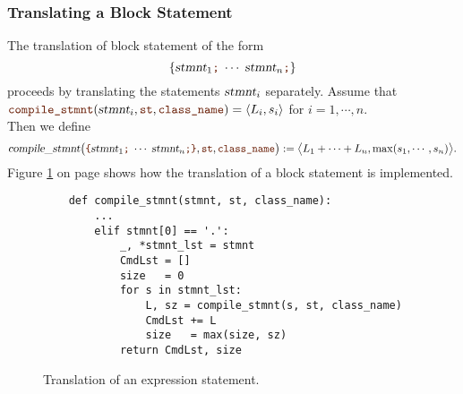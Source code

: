 \subsubsection{Translating a Block Statement}
The translation of block statement of the form
\[ \{ \textsl{stmnt}_1\mytt{;}\; \cdots\; \textsl{stmnt}_n\mytt{;} \} \]
proceeds by translating the statements $\textsl{stmnt}_i$ separately.  Assume that
\\[0.2cm]
\hspace*{1.3cm}
$\mytt{compile\_stmnt}(\textsl{stmnt}_i, \mytt{st}, \mytt{class\_name}) = \pair(L_i, s_i)$
\quad for $i=1,\cdots,n$.
\\[0.2cm]
Then we define
\[
     \textsl{compile\_stmnt}\bigl(\mytt{\{} \textsl{stmnt}_1\mytt{;}\; \cdots\; \textsl{stmnt}_n\mytt{;} \mytt{\}},
     \mytt{st}, \mytt{class\_name}\bigr) :=
     \bigl\langle L_1 + \cdots + L_n, \max(s_1, \cdots, s_n) \bigr\rangle.
\]
Figure \ref{fig:Compiler.ipynb:compile:block} on page \pageref{fig:Compiler.ipynb:compile:block} shows how the
translation of a block statement is implemented.

\begin{figure}[!ht]
\centering
\begin{verbatim}
    def compile_stmnt(stmnt, st, class_name):
        ...
        elif stmnt[0] == '.':
            _, *stmnt_lst = stmnt 
            CmdLst = []
            size   = 0
            for s in stmnt_lst:
                L, sz = compile_stmnt(s, st, class_name)
                CmdLst += L
                size   = max(size, sz)
            return CmdLst, size
\end{verbatim}
\vspace*{-0.3cm}
\caption{Translation of an expression statement.}
\label{fig:Compiler.ipynb:compile:block}
\end{figure}


